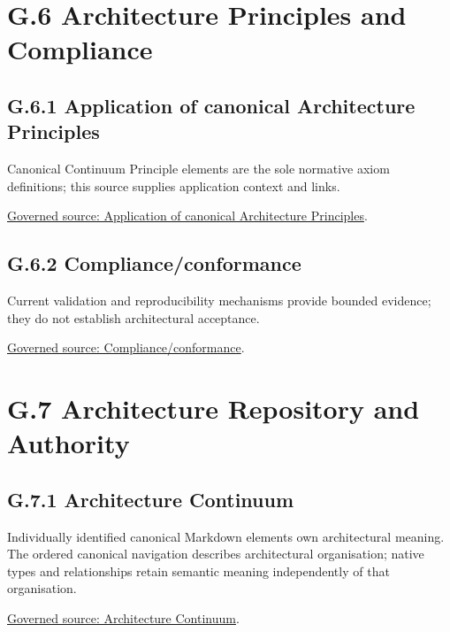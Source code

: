 \section*{G.6 Architecture Principles and Compliance}
\label{navigation:G.6}

\subsection*{G.6.1 Application of canonical Architecture Principles}
\label{navigation:G.6.1}

Canonical Continuum Principle elements are the sole normative axiom definitions; this source supplies application context and links.\par
\href{../../../../../../../../governance/architectural-axioms.md}{Governed source: Application of canonical Architecture Principles}.\par
\subsection*{G.6.2 Compliance/conformance}
\label{navigation:G.6.2}

Current validation and reproducibility mechanisms provide bounded evidence; they do not establish architectural acceptance.\par
\href{../../../../../../../../tooling/README.md}{Governed source: Compliance/conformance}.\par
\section*{G.7 Architecture Repository and Authority}
\label{navigation:G.7}

\subsection*{G.7.1 Architecture Continuum}
\label{navigation:G.7.1}

Individually identified canonical Markdown elements own architectural meaning. The ordered canonical navigation describes architectural organisation; native types and relationships retain semantic meaning independently of that organisation.\par
\href{../../../../../../../../governance/continuum-representation.md}{Governed source: Architecture Continuum}.\par

